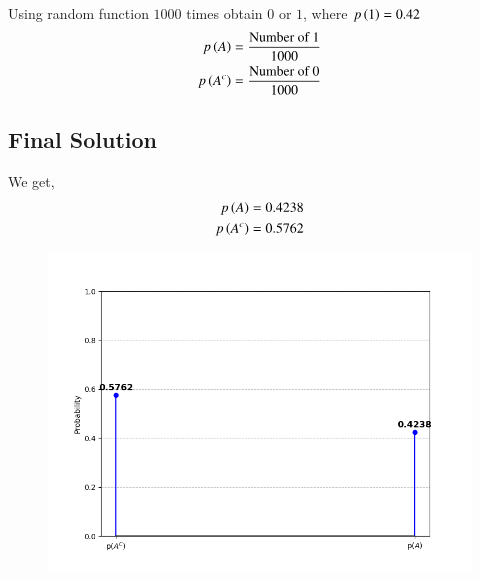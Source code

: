 \documentclass[journal]{IEEEtran}
\begin{document}
Using random function $1000$ times obtain $0$ or $1$, where $p\left(1\right)=0.42$ 
\begin{align}
    p\left(A\right)=\frac{\text{Number of 1}}{1000}\\
        p\left(A^c\right)=\frac{\text{Number of 0}}{1000}
\end{align}

	\subsection*{Final Solution}
	We get,
    \begin{align}
        p\left(A\right)=0.4238 \\
        p\left(A^c\right)=0.5762
    \end{align}

\begin{figure}[h]
    \centering
    \includegraphics[width=\columnwidth]{figs/Figure_1.png}
    \label{fig:Plot}
    \end{figure}
\end{document}
